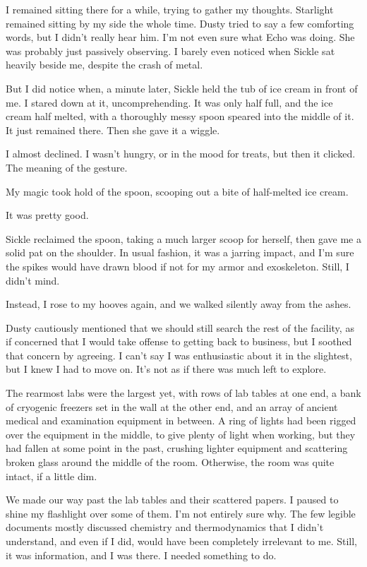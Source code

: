 I remained sitting there for a while, trying to gather my thoughts. Starlight remained sitting by my side the whole time. Dusty tried to say a few comforting words, but I didn’t really hear him. I’m not even sure what Echo was doing. She was probably just passively observing. I barely even noticed when Sickle sat heavily beside me, despite the crash of metal.

But I did notice when, a minute later, Sickle held the tub of ice cream in front of me. I stared down at it, uncomprehending. It was only half full, and the ice cream half melted, with a thoroughly messy spoon speared into the middle of it. It just remained there. Then she gave it a wiggle.

I almost declined. I wasn’t hungry, or in the mood for treats, but then it clicked. The meaning of the gesture.

My magic took hold of the spoon, scooping out a bite of half-melted ice cream.

It was pretty good.

Sickle reclaimed the spoon, taking a much larger scoop for herself, then gave me a solid pat on the shoulder. In usual fashion, it was a jarring impact, and I’m sure the spikes would have drawn blood if not for my armor and exoskeleton. Still, I didn’t mind.

Instead, I rose to my hooves again, and we walked silently away from the ashes.

Dusty cautiously mentioned that we should still search the rest of the facility, as if concerned that I would take offense to getting back to business, but I soothed that concern by agreeing. I can’t say I was enthusiastic about it in the slightest, but I knew I had to move on. It’s not as if there was much left to explore.

The rearmost labs were the largest yet, with rows of lab tables at one end, a bank of cryogenic freezers set in the wall at the other end, and an array of ancient medical and examination equipment in between. A ring of lights had been rigged over the equipment in the middle, to give plenty of light when working, but they had fallen at some point in the past, crushing lighter equipment and scattering broken glass around the middle of the room. Otherwise, the room was quite intact, if a little dim.

We made our way past the lab tables and their scattered papers. I paused to shine my flashlight over some of them. I’m not entirely sure why. The few legible documents mostly discussed chemistry and thermodynamics that I didn’t understand, and even if I did, would have been completely irrelevant to me. Still, it was information, and I was there. I needed something to do.

